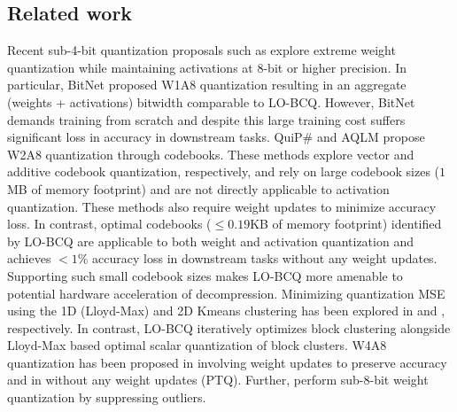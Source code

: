 \subsection{Related work}
Recent sub-4-bit quantization proposals such as \citep{wang2023bitnet,tseng2024quipbetterllmquantization,egiazarian2024aqlm} explore extreme weight quantization while maintaining activations at $8$-bit or higher precision. In particular, BitNet \citep{wang2023bitnet} proposed W1A8 quantization resulting in an aggregate (weights + activations) bitwidth comparable to LO-BCQ. However, BitNet demands training from scratch and despite this large training cost suffers significant loss in accuracy in downstream tasks. QuiP\# \citep{tseng2024quipbetterllmquantization} and AQLM \citep{egiazarian2024aqlm} propose W2A8 quantization through codebooks. These methods explore vector and additive codebook quantization, respectively, and rely on large codebook sizes ($1$MB of memory footprint) and are not directly applicable to activation quantization. These methods also require weight updates to minimize accuracy loss. In contrast, optimal codebooks ($\le0.19$KB of memory footprint) identified by LO-BCQ are applicable to both weight and activation quantization and achieves $<1$\% accuracy loss in downstream tasks without any weight updates. Supporting such small codebook sizes makes LO-BCQ more amenable to potential hardware acceleration of decompression. Minimizing quantization MSE using the 1D (Lloyd-Max) and 2D Kmeans clustering has been explored in \citep{han2016deepcompression,cho2021dkmdk,cho2023edkm} and \citep{vanbaalen2024gptvq}, respectively. In contrast, LO-BCQ iteratively optimizes block clustering alongside Lloyd-Max based optimal scalar quantization of block clusters. W4A8 quantization has been proposed in \citep{frantar2023optq, bai2021efficient, yao2022zeroquant} involving weight updates to preserve accuracy and in \citep{lin2023awq,vanbaalen2024gptvq} without any weight updates (PTQ). Further, \citep{Guo2023olive,wei2023outlier,kim2023squeezellm} perform sub-8-bit weight quantization by suppressing outliers.  

